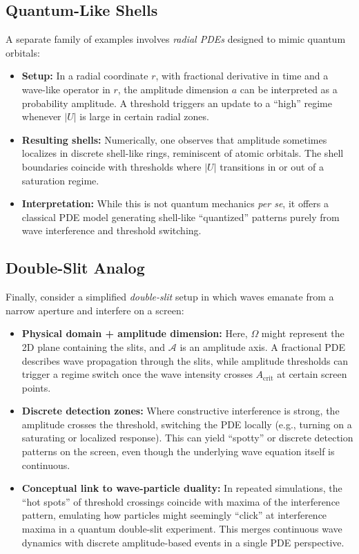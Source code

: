 \documentclass[12pt]{article}
\begin{document}
\subsection{Quantum-Like Shells}
\label{subsec:quantum_shells}

A separate family of examples involves \emph{radial PDEs} designed to mimic
quantum orbitals:
\begin{itemize}
    \item \textbf{Setup:}
    In a radial coordinate $r$, with fractional derivative in time and a wave-like
    operator in $r$, the amplitude dimension $a$ can be interpreted as a probability
    amplitude. A threshold triggers an update to a “high” regime whenever $|U|$ is
    large in certain radial zones.
    \item \textbf{Resulting shells:}
    Numerically, one observes that amplitude sometimes localizes in discrete shell-like
    rings, reminiscent of atomic orbitals. The shell boundaries coincide with thresholds
    where $|U|$ transitions in or out of a saturation regime.
    \item \textbf{Interpretation:}
    While this is not quantum mechanics \emph{per se}, it offers a classical PDE
    model generating shell-like “quantized” patterns purely from wave interference
    and threshold switching.
\end{itemize}

\subsection{Double-Slit Analog}
\label{subsec:double_slit_analog}

Finally, consider a simplified \emph{double-slit} setup in which waves emanate
from a narrow aperture and interfere on a screen:
\begin{itemize}
    \item \textbf{Physical domain + amplitude dimension:}
    Here, $\Omega$ might represent the 2D plane containing the slits, and $\mathcal{A}$
    is an amplitude axis. A fractional PDE describes wave propagation through the slits,
    while amplitude thresholds can trigger a regime switch once the wave intensity
    crosses $A_{\mathrm{crit}}$ at certain screen points.
    \item \textbf{Discrete detection zones:}
    Where constructive interference is strong, the amplitude crosses the threshold,
    switching the PDE locally (e.g., turning on a saturating or localized response).
    This can yield “spotty” or discrete detection patterns on the screen, even though
    the underlying wave equation itself is continuous.
    \item \textbf{Conceptual link to wave-particle duality:}
    In repeated simulations, the “hot spots” of threshold crossings coincide with
    maxima of the interference pattern, emulating how particles might seemingly
    “click” at interference maxima in a quantum double-slit experiment. This
    merges continuous wave dynamics with discrete amplitude-based events in a
    single PDE perspective.
\end{itemize}
\end{document}
